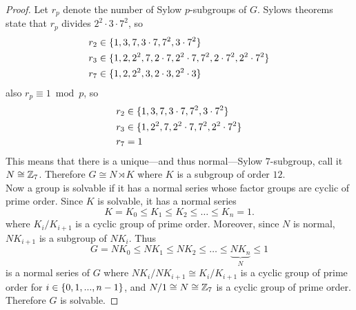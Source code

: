 \documentclass{article}
\begin{document}
\begin{proof}
  Let $r_p$ denote the number of Sylow $p$-subgroups of $G$. Sylows theorems
  state that $r_p$ divides $2^2 \cdot 3 \cdot 7^2$, so \begin{align*}
    r_2 &\in \{1, 3, 7, 3 \cdot 7, 7^2, 3 \cdot 7^2\} \\
    r_3 &\in \{1, 2, 2^2, 7, 2 \cdot 7, 2^2 \cdot 7, 7^2, 2 \cdot 7^2, 2^2 \cdot 7^2\} \\
    r_7 &\in \{1, 2, 2^2, 3, 2 \cdot 3, 2^2 \cdot 3\}
  \end{align*} also $r_p \equiv 1 \bmod p$, so
  \begin{align*}
    r_2 &\in \{1, 3, 7, 3 \cdot 7, 7^2, 3 \cdot 7^2\} \\
    r_3 &\in \{1, 2^2, 7, 2^2 \cdot 7, 7^2, 2^2 \cdot 7^2\} \\
    r_7 &= 1
  \end{align*}
  This means that there is a unique---and thus normal---Sylow $7$-subgroup,
  call it $N \cong \mathbb Z_7$.
  Therefore $G \cong N \rtimes K$ where $K$ is a subgroup of order $12$.
  \\
  Now a group is solvable if it has a normal series whose factor groups are
  cyclic of prime order. Since $K$ is solvable, it has a normal series \[
    K = K_0 \leq K_1 \leq K_2 \leq \hdots \leq K_n = 1.
  \] where $K_{i}/K_{i+1}$ is a cyclic group of prime order.
  Moreover, since $N$ is normal, $NK_{i+1}$ is a subgroup of $NK_{i}$. Thus \[
    G = NK_0 \leq NK_1 \leq NK_2 \leq \hdots \leq \underbrace{NK_n}_N \leq 1
  \] is a normal series of $G$ where $NK_{i}/NK_{i+1} \cong K_{i}/K_{i+1}$ is a
  cyclic group of prime order for $i \in \{0,1,..., n-1\}$, and
  $N/1 \cong N \cong \mathbb Z_7$ is a cyclic group of prime order.
  Therefore $G$ is solvable.
\end{proof}
\end{document}
